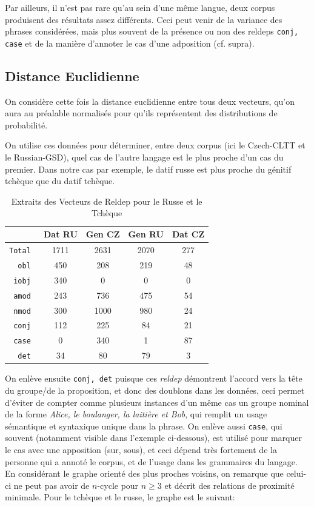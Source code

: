 \documentclass{cours}
\begin{document}
\medskip
Par ailleurs, il n'est pas rare qu'au sein d'une même langue, deux corpus produisent des résultats assez différents. Ceci peut venir de la variance des phrases considérées, mais plus souvent de la présence ou non des reldeps \texttt{conj, case} et de la manière d'annoter le cas d'une adposition (cf. supra).

\subsection{Distance Euclidienne}\label{subsec:l2}
On considère cette fois la distance euclidienne entre tous deux vecteurs, qu'on aura au préalable normalisés pour qu'ils représentent des distributions de probabilité.



On utilise ces données pour déterminer, entre deux corpus (ici le Czech-CLTT et le Russian-GSD), quel cas de l'autre langage est le plus proche d'un cas du premier.
Dans notre cas par exemple, le datif russe est plus proche du génitif tchèque que du datif tchèque.

\begin{table}[H]
	\centering
	\begin{tabular}{>{\tt}r|cccc}
		\toprule
		&Dat RU & Gen CZ & Gen RU & Dat CZ\\
		\midrule
		Total & 1711 & 2631 & 2070 & 277\\
		obl & 450 & 208 & 219 & 48\\
		iobj & 340 & 0 & 0 & 0\\
		amod & 243 & 736 & 475 & 54\\
		nmod & 300 & 1000 & 980 & 24\\
		conj & 112 & 225 & 84 & 21\\
		case & 0 & 340 & 1 & 87\\
		det & 34 & 80 & 79 & 3\\
		\bottomrule
	\end{tabular}
	\caption{Extraits des Vecteurs de Reldep pour le Russe et le Tchèque}
\end{table}

On enlève ensuite \texttt{conj, det} puisque ces \textit{reldep} démontrent l'accord vers la tête du groupe/de la proposition, et donc des doublons dans les données, ceci permet d'éviter de compter comme plusieurs instances d'un même cas un groupe nominal de la forme \emph{Alice, le boulanger, la laitière et Bob}, qui remplit un usage sémantique et syntaxique unique dans la phrase.
On enlève aussi \texttt{case}, qui souvent (notamment visible dans l'exemple ci-dessous), est utilisé pour marquer le cas avec une apposition (sur, sous), et ceci dépend très fortement de la personne qui a annoté le corpus, et de l'usage dans les grammaires du langage.\\
\medskip
En considérant le graphe orienté des plus proches voisins, on remarque que celui-ci ne peut pas avoir de $n$-cycle pour $n \geq 3$ et décrit des relations de proximité minimale.
Pour le tchèque et le russe, le graphe est le suivant:
\end{document}
